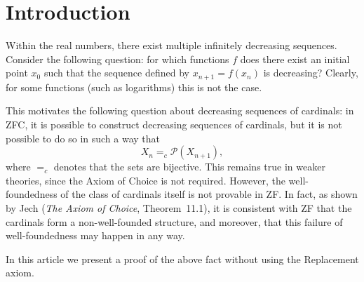 \section*{Introduction}

Within the real numbers, there exist multiple infinitely decreasing sequences. Consider the following question: for which functions \(f\) does there exist an initial point \(x_0\) such that the sequence defined by \(x_{n+1} = f(x_n)\) is decreasing? Clearly, for some functions (such as logarithms) this is not the case.

This motivates the following question about decreasing sequences of cardinals: in ZFC, it is possible to construct decreasing sequences of cardinals, but it is not possible to do so in such a way that
\[
X_n =_c \mathcal{P}(X_{n+1}),
\]
where $=_c$ denotes that the sets are bijective. This remains true in weaker theories, since the Axiom of Choice is not required.
However, the well-foundedness of the class of cardinals itself is not provable in ZF. In fact, as shown by Jech (\emph{The Axiom of Choice}, Theorem~11.1), it is consistent with ZF that the cardinals form a non-well-founded structure, and moreover, that this failure of well-foundedness may happen in any way.

 In this article we present a proof of the above fact without using the Replacement axiom.